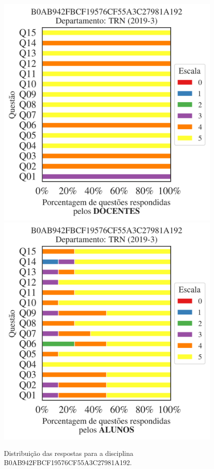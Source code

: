 \documentclass[a4paper,10pt]{article}
\begin{document}
\begin{figure}[h]
\centering
\includegraphics[width=0.485\linewidth]{analise_disciplina_departamento_TRN_B0AB942FBCF19576CF55A3C27981A192_docentes.png}
\includegraphics[width=0.485\linewidth]{analise_disciplina_departamento_TRN_B0AB942FBCF19576CF55A3C27981A192_alunos.png}
\caption{\label{fig:analise_geral_departamento}                Distribuição das respostas para a disciplina B0AB942FBCF19576CF55A3C27981A192. }
\end{figure}
\end{document}
